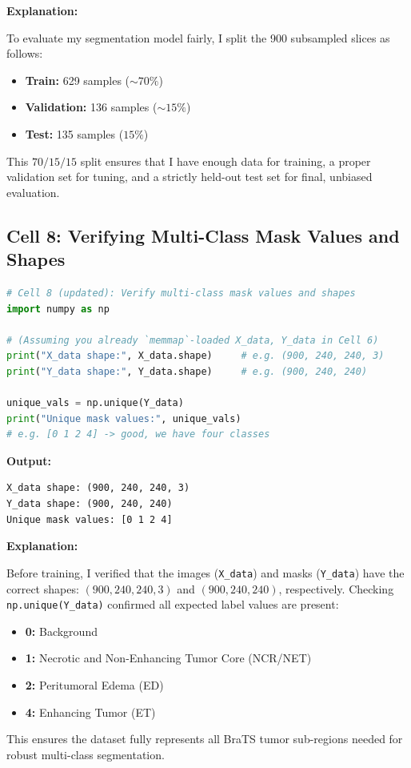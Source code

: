 \noindent\textbf{Explanation:}

To evaluate my segmentation model fairly, I split the 900 subsampled slices as follows:
\begin{itemize}
    \item \textbf{Train:} 629 samples ($\sim70\%$)
    \item \textbf{Validation:} 136 samples ($\sim15\%$)
    \item \textbf{Test:} 135 samples ($15\%$)
\end{itemize}

This $70/15/15$ split ensures that I have enough data for training, a proper validation set for tuning, and a strictly held-out test set for final, unbiased evaluation.






\FloatBarrier


\subsection{Cell 8: Verifying Multi-Class Mask Values and Shapes}

\begin{lstlisting}[language=Python]
# Cell 8 (updated): Verify multi-class mask values and shapes
import numpy as np

# (Assuming you already `memmap`-loaded X_data, Y_data in Cell 6)
print("X_data shape:", X_data.shape)     # e.g. (900, 240, 240, 3)
print("Y_data shape:", Y_data.shape)     # e.g. (900, 240, 240)

unique_vals = np.unique(Y_data)
print("Unique mask values:", unique_vals)
# e.g. [0 1 2 4] -> good, we have four classes
\end{lstlisting}

\noindent\textbf{Output:}
\begin{lstlisting}[style=output]
X_data shape: (900, 240, 240, 3)
Y_data shape: (900, 240, 240)
Unique mask values: [0 1 2 4]
\end{lstlisting}

\noindent\textbf{Explanation:}

Before training, I verified that the images (\texttt{X\_data}) and masks (\texttt{Y\_data}) have the correct shapes: $(900, 240, 240, 3)$ and $(900, 240, 240)$, respectively. Checking \texttt{np.unique(Y\_data)} confirmed all expected label values are present:
\clearpage
\begin{itemize}
    \item \textbf{0:} Background
    \item \textbf{1:} Necrotic and Non-Enhancing Tumor Core (NCR/NET)
    \item \textbf{2:} Peritumoral Edema (ED)
    \item \textbf{4:} Enhancing Tumor (ET)
\end{itemize}
This ensures the dataset fully represents all BraTS tumor sub-regions needed for robust multi-class segmentation.

